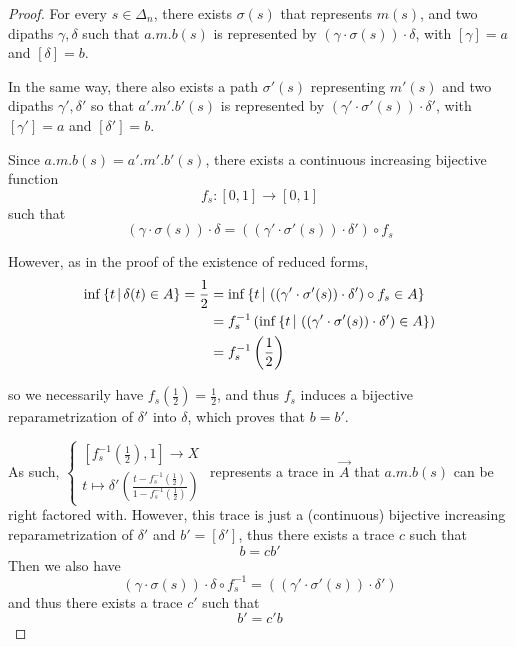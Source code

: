 \documentclass[a4paper,fleqn]{cas-sc}
\begin{document}
\begin{proof}
For every $s \in \Delta_n$, there exists $\sigma(s)$ that represents $m(s)$, and two dipaths $\gamma, \delta$ such that $a.m.b (s)$ is represented by $(\gamma \cdot \sigma(s) ) \cdot \delta$,
with $[\gamma] = a$ and $[\delta] = b$.

In the same way, there also exists a path  $\sigma'(s)$ representing $m'(s)$ and two dipaths $\gamma', \delta'$ so that $a'.m'.b'(s)$ is represented by $(\gamma' \cdot \sigma'(s) ) \cdot \delta'$,  with $[\gamma'] = a$ and $[\delta'] = b$.

Since $a.m.b(s) = a'.m'.b'(s)$, there exists a continuous increasing bijective function
\[
f_s : [0,1] \to [0,1]
\]
\noindent such that 
\[
    (\gamma \cdot \sigma(s) ) \cdot \delta =  
    \left( (\gamma' \cdot \sigma'(s) ) \cdot \delta' \right) \circ f_s \]
    
    
 However, as in the proof of the existence of reduced forms,
 \begin{align*}
     \inf \left\{t 
 \; \vline \;
 \delta (t) \in A
 \right\}
 =\frac{1}{2} 
 &= 
 \inf \left\{t 
 \; \vline \;
 \left( (\gamma' \cdot \sigma'(s) ) \cdot \delta' \right) \circ f_s \in A
 \right\}\\
 &=  f_s^{-1} \left( \inf \left\{t 
 \; \vline \;
 \left( (\gamma' \cdot \sigma'(s) ) \cdot \delta' \right) \in A
 \right\}
 \right)
 \\
 &= f_s^{-1} \left(\frac{1}{2}\right)
 \end{align*}

 so we necessarily have $f_s(\frac{1}{2}) = \frac{1}{2}$, and thus $f_s$ induces a bijective reparametrization of $\delta'$ into $\delta$, which proves that $b=b'$.

\iffalse
As such, 
$\begin{cases}
[f_s^{-1}(\frac{1}{2}), 1] \to X\\
t \mapsto \delta' \left( \frac{t - f_s^{-1}(\frac{1}{2})}{1 - f_s^{-1}(\frac{1}{2})} \right)
\end{cases}$
\noindent represents a trace in $\Vec{A}$ that $a.m.b(s)$ can be right factored with. However, this trace is just a (continuous) bijective increasing reparametrization of $\delta'$ and $b' = [\delta']$, thus there exists a trace $c$ such that
\[ b = c b'\]
Then we also have 
\[
    (\gamma \cdot \sigma(s) ) \cdot \delta \circ f_s^{-1}  =  
    \left( (\gamma' \cdot \sigma'(s) ) \cdot \delta' \right) 
\]
\noindent and thus there exists a trace $c'$ such that
\[b' = c' b \]


\end{proof}
\end{document}
